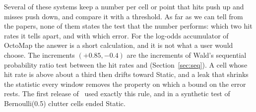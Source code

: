 Several of these systems keep a number per cell or point that hits push up and misses push down, and compare it with a threshold. As far as we can tell from the papers, none of them states the test that the number performs: which two hit rates it tells apart, and with which error. For the log-odds accumulator of OctoMap \citep{hornung2013octomap} the answer is a short calculation, and it is not what a user would choose. The increments $(+0.85,-0.4)$ are the increments of Wald's sequential probability ratio test \citep{wald1947sequential} between the hit rates \SqLegMzero{} and \SqLegMone{} (Section~\ref{sec:seq}). A cell whose hit rate is above about a third then drifts toward Static, and a leak that shrinks the statistic every window removes the property on which a bound on the error rests. The first release of \sname\ used exactly this rule, and in a synthetic test \SqEsixShippedLeg{} of \SqCellsAperiodic{} Bernoulli(0.5) clutter cells ended Static.

